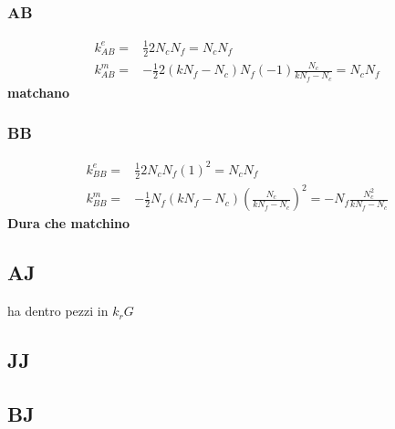 \documentclass[a4paper,12pt]{article}
\begin{document}
  \subsubsection*{AB}
  \begin{align*}
   k^e_{AB} = & \frac{1}{2} 2 N_c N_f = N_c N_f \\
   k^m_{AB} = & - \frac{1}{2} 2 (k N_f - N_c) N_f ( -1) \frac{N_c}{k N_f - N_c} = N_c N_f 
  \end{align*}
  \textbf{matchano}
  
  \subsubsection*{BB}
  \begin{align*}
   k^e_{BB} = & \frac{1}{2} 2 N_c N_f (1)^2 = N_c N_f \\
   k^m_{BB} = & - \frac{1}{2} N_f (k N_f - N_c) \left( \frac{N_c}{k N_f - N_c} \right)^2 = - N_f \frac{N_c^2}{k N_f - N_c}   
  \end{align*}
  \textbf{Dura che matchino}
  \subsection*{AJ}
  ha dentro pezzi in $k_rG$
  \subsection*{JJ}
  
  \subsection*{BJ}
  
  
\newpage
\nocite{*}


\end{document}
